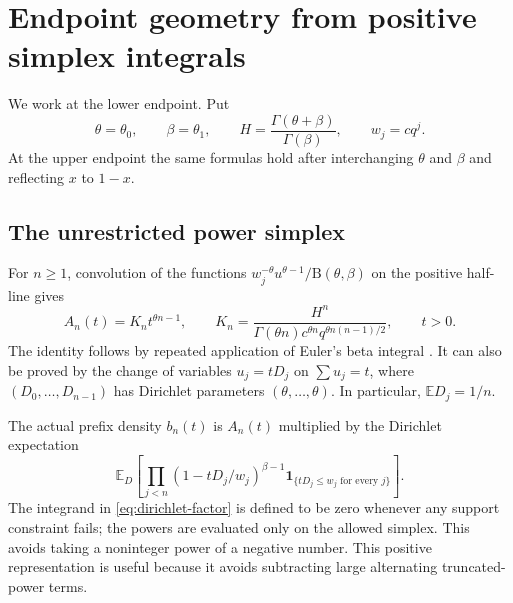 \documentclass[11pt,a4paper]{article}
\numberwithin{equation}{section}
\theoremstyle{definition}\newaliascnt{definition}{theorem}
\theoremstyle{remark}\newaliascnt{remark}{theorem}
\newcommand{\E}{\mathbb E}\newcommand{\Prb}{\mathbb P}
\newcommand{\Bf}{\mathrm B}
\begin{document}
\section{Endpoint geometry from positive simplex integrals}
\label{sec:geometry}
We work at the lower endpoint. Put
\begin{equation}
 \theta=\theta_0,\qquad \beta=\theta_1,\qquad
 H=\frac{\Gamma(\theta+\beta)}{\Gamma(\beta)},
 \qquad w_j=cq^j.
 \label{eq:endpoint-notation}
\end{equation}
At the upper endpoint the same formulas hold after interchanging
$\theta$ and $\beta$ and reflecting $x$ to $1-x$.

\subsection{The unrestricted power simplex}
For $n\ge1$, convolution of the functions
$w_j^{-\theta}u^{\theta-1}/\Bf(\theta,\beta)$ on the positive half-line gives
\begin{equation}
 A_n(t)=K_n t^{\theta n-1},\qquad
 K_n=\frac{H^n}{\Gamma(\theta n)c^{\theta n}
                         q^{\theta n(n-1)/2}},\qquad t>0.
 \label{eq:power-simplex}
\end{equation}
The identity follows by repeated application of Euler's beta integral
\cite{dlmf-beta}. It can also be proved by the change of variables
$u_j=tD_j$ on $\sum u_j=t$, where
$(D_0,\ldots,D_{n-1})$ has Dirichlet parameters $(\theta,\ldots,\theta)$.
In particular, $\E D_j=1/n$.

The actual prefix density $b_n(t)$ is $A_n(t)$ multiplied by the Dirichlet
expectation
\begin{equation}
 \E_D\left[\prod_{j<n}
 (1-tD_j/w_j)^{\beta-1}
 \boldsymbol1_{\{tD_j\le w_j\text{ for every }j\}}\right].
 \label{eq:dirichlet-factor}
\end{equation}
The integrand in \eqref{eq:dirichlet-factor} is defined to be zero whenever
any support constraint fails; the powers are evaluated only on the allowed
simplex. This avoids taking a noninteger power of a negative number.
This positive representation is useful because it avoids subtracting large
alternating truncated-power terms.
\end{document}
